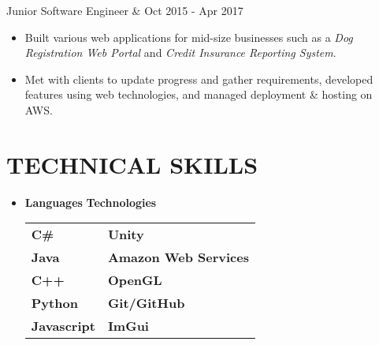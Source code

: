 \documentclass[resmargin,10pt]{res} %
\begin{document}
\begin{resume}
                \begin{ncolumn}{2} %
                Junior Software Engineer &  \hfill Oct 2015 - Apr 2017
                \end{ncolumn}
                \begin{itemize}           
                \item  Built various web applications for mid-size businesses such as a \textit{Dog Registration Web Portal} and \textit{Credit Insurance Reporting System}.
                \item Met with clients to update progress and gather requirements, developed features using web technologies, and managed deployment \& hosting on AWS.
                \end{itemize}
                    
\section{TECHNICAL SKILLS}	
							\begin{itemize}
                    		\item[] 
\textbf{\large Languages}  \hspace*{.5in} \textbf{\large Technologies}        \\
\begin{tabular}{ll}
\textbf{C\#} \hspace*{1in}  & \textbf{Unity} \\
\textbf{Java} & \textbf{Amazon Web Services} \\
\textbf{C++}   & \textbf{OpenGL}       \\
\textbf{Python}  & \textbf{Git/GitHub}               \\
\textbf{Javascript} & \textbf{ImGui}               \\
\end{tabular}
                    		\end{itemize} 

\end{resume}
\end{document}
